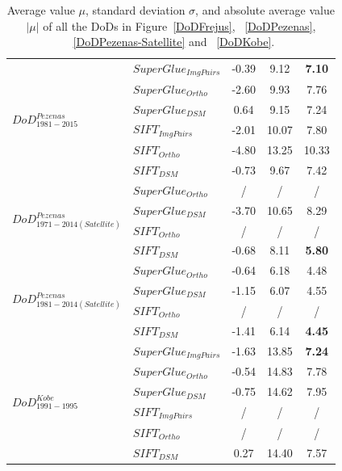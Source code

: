 \begin{table}
\begin{tabular}{||l|l|c|c|c||}
		\multirow{6}{*}{$DoD^{Pezenas}_{1981-2015}$}
		&${SuperGlue_{ImgPairs}}$ & -0.39 & 9.12 & \textbf{7.10}\\
		&${SuperGlue_{Ortho}}$ & -2.60 & 9.93 & 7.76\\
		&${SuperGlue_{DSM}}$ & 0.64 & 9.15 & 7.24\\
		&${SIFT_{ImgPairs}}$ & -2.01 & 10.07 & 7.80\\
		&${SIFT_{Ortho}}$ & -4.80 & 13.25 & 10.33\\
		&${SIFT_{DSM}}$ & -0.73 & 9.67 & 7.42\\\hline
		
		\multirow{4}{*}{$DoD^{Pezenas}_{1971-2014(Satellite)}$}
		&${SuperGlue_{Ortho}}$ & / & / & /\\
		&${SuperGlue_{DSM}}$ & -3.70 & 10.65 & 8.29\\
		&${SIFT_{Ortho}}$ & / & / & /\\
		&${SIFT_{DSM}}$ & -0.68 & 8.11 & \textbf{5.80} \\\hline
		
		\multirow{4}{*}{$DoD^{Pezenas}_{1981-2014(Satellite)}$}
		&${SuperGlue_{Ortho}}$ & -0.64 & 6.18 & 4.48\\
		&${SuperGlue_{DSM}}$ & -1.15 & 6.07 & 4.55\\
		&${SIFT_{Ortho}}$ & / & / & /\\
		&${SIFT_{DSM}}$ & -1.41 & 6.14 & \textbf{4.45} \\\hline
		
		
		\multirow{6}{*}{$DoD^{Kobe}_{1991-1995}$}
		&${SuperGlue_{ImgPairs}}$ & -1.63 & 13.85 & \textbf{7.24}\\
		&${SuperGlue_{Ortho}}$ & -0.54 & 14.83 & 7.78\\
		&${SuperGlue_{DSM}}$ & -0.75 & 14.62 & 7.95\\
		&${SIFT_{ImgPairs}}$ & / & / & / \\
		&${SIFT_{Ortho}}$ & / & / & / \\
		&${SIFT_{DSM}}$ & 0.27 & 14.40 & 7.57\\\hline
		
	\end{tabular}
	\caption{Average value $\mu$, standard deviation $\sigma$, and absolute average value $|\mu|$ of all the \ac{DoD}s in Figure~\ref{DoDFrejus}, ~\ref{DoDPezenas}, ~\ref{DoDPezenas-Satellite} and ~\ref{DoDKobe}.}
	\label{DoDStatistic}
\end{table}
